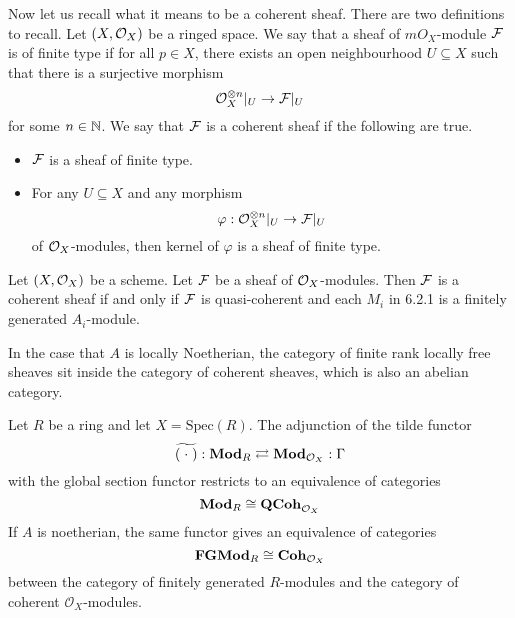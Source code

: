 \documentclass[a4paper]{article}
\begin{document}
Now let us recall what it means to be a coherent sheaf. There are two definitions to recall. Let $(X,\mathcal{O}_X)$ be a ringed space. We say that a sheaf of $mO_X$-module $\mathcal{F}$ is of finite type if for all $p\in X$, there exists an open neighbourhood $U\subseteq X$ such that there is a surjective morphism $$\mathcal{O}_X^{\otimes n}|_U\to\mathcal{F}|_U$$ for some $n\in\mathbb{N}$. We say that $\mathcal{F}$ is a coherent sheaf if the following are true. 
\begin{itemize}
\item $\mathcal{F}$ is a sheaf of finite type. 
\item For any $U\subseteq X$ and any morphism $$\varphi:\mathcal{O}_X^{\otimes n}|_U\to\mathcal{F}|_U$$ of $\mathcal{O}_X$-modules, then kernel of $\varphi$ is a sheaf of finite type. 
\end{itemize}

\begin{thm}{}{} Let $(X,\mathcal{O}_X)$ be a scheme. Let $\mathcal{F}$ be a sheaf of $\mathcal{O}_X$-modules. Then $\mathcal{F}$ is a coherent sheaf if and only if $\mathcal{F}$ is quasi-coherent and each $M_i$ in 6.2.1 is a finitely generated $A_i$-module. 
\end{thm}

In the case that $A$ is locally Noetherian, the category of finite rank locally free sheaves sit inside the category of coherent sheaves, which is also an abelian category. 

\begin{thm}{}{} Let $R$ be a ring and let $X=\text{Spec}(R)$. The adjunction of the tilde functor $$\widetilde{(\;\cdot\;)}:\bold{Mod}_R\rightleftarrows\bold{Mod}_{\mathcal{O}_X}:\Gamma$$ with the global section functor restricts to an equivalence of categories $$\bold{Mod}_R\cong\bold{QCoh}_{\mathcal{O}_X}$$ If $A$ is noetherian, the same functor gives an equivalence of categories $$\bold{FGMod}_R\cong\bold{Coh}_{\mathcal{O}_X}$$ between the category of finitely generated $R$-modules and the category of coherent $\mathcal{O}_X$-modules. 
\end{thm}
\end{document}
